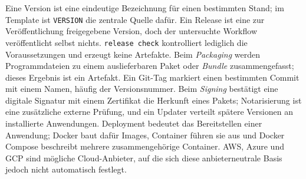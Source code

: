 \begin{beginnerstatement}

Eine Version ist eine eindeutige Bezeichnung für einen bestimmten Stand; im
Template ist \texttt{VERSION} die zentrale Quelle dafür. Ein Release ist eine
zur Veröffentlichung freigegebene Version, doch der untersuchte Workflow
veröffentlicht selbst nichts. \texttt{release check} kontrolliert lediglich
die Voraussetzungen und erzeugt keine Artefakte. Beim \emph{Packaging} werden
Programmdateien zu einem auslieferbaren Paket oder \emph{Bundle}
zusammengefasst; dieses Ergebnis ist ein Artefakt. Ein Git-Tag markiert einen
bestimmten Commit mit einem Namen, häufig der Versionsnummer. Beim
\emph{Signing} bestätigt eine digitale Signatur mit einem Zertifikat die
Herkunft eines Pakets; Notarisierung ist eine zusätzliche externe Prüfung, und
ein Updater verteilt spätere Versionen an installierte Anwendungen. Deployment
bedeutet das Bereitstellen einer Anwendung; Docker baut dafür Images,
Container führen sie aus und Docker Compose beschreibt mehrere
zusammengehörige Container. AWS, Azure und GCP sind mögliche Cloud-Anbieter,
auf die sich diese anbieterneutrale Basis jedoch nicht automatisch festlegt.

\end{beginnerstatement}
